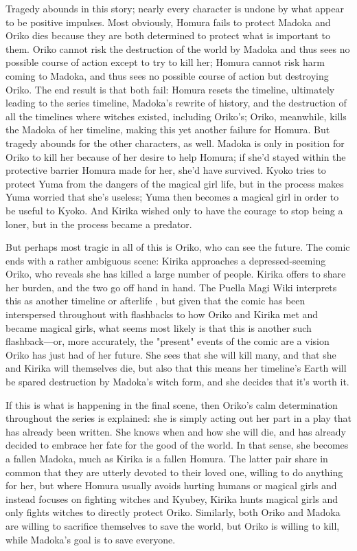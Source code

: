 Tragedy abounds in this story; nearly every character is undone by what appear to be positive impulses. Most obviously, Homura fails to protect Madoka and Oriko dies because they are both determined to protect what is important to them. Oriko cannot risk the destruction of the world by Madoka and thus sees no possible course of action except to try to kill her; Homura cannot risk harm coming to Madoka, and thus sees no possible course of action but destroying Oriko. The end result is that both fail: Homura resets the timeline, ultimately leading to the series timeline, Madoka's rewrite of history, and the destruction of all the timelines where witches existed, including Oriko's; Oriko, meanwhile, kills the Madoka of her timeline, making this yet another failure for Homura. But tragedy abounds for the other characters, as well. Madoka is only in position for Oriko to kill her because of her desire to help Homura; if she'd stayed within the protective barrier Homura made for her, she'd have survived. Kyoko tries to protect Yuma from the dangers of the magical girl life, but in the process makes Yuma worried that she's useless; Yuma then becomes a magical girl in order to be useful to Kyoko. And Kirika wished only to have the courage to stop being a loner, but in the process became a predator.

But perhaps most tragic in all of this is Oriko, who can see the future. The comic ends with a rather ambiguous scene: Kirika approaches a depressed-seeming Oriko, who reveals she has killed a large number of people. Kirika offers to share her burden, and the two go off hand in hand. The Puella Magi Wiki interprets this as another timeline or afterlife \cite{ref105}, but given that the comic has been interspersed throughout with flashbacks to how Oriko and Kirika met and became magical girls, what seems most likely is that this is another such flashback—or, more accurately, the "present" events of the comic are a vision Oriko has just had of her future. She sees that she will kill many, and that she and Kirika will themselves die, but also that this means her timeline's Earth will be spared destruction by Madoka's witch form, and she decides that it's worth it.

If this is what is happening in the final scene, then Oriko's calm determination throughout the series is explained: she is simply acting out her part in a play that has already been written. She knows when and how she will die, and has already decided to embrace her fate for the good of the world. In that sense, she becomes a fallen Madoka, much as Kirika is a fallen Homura. The latter pair share in common that they are utterly devoted to their loved one, willing to do anything for her, but where Homura usually avoids hurting humans or magical girls and instead focuses on fighting witches and Kyubey, Kirika hunts magical girls and only fights witches to directly protect Oriko. Similarly, both Oriko and Madoka are willing to sacrifice themselves to save the world, but Oriko is willing to kill, while Madoka's goal is to save everyone.

